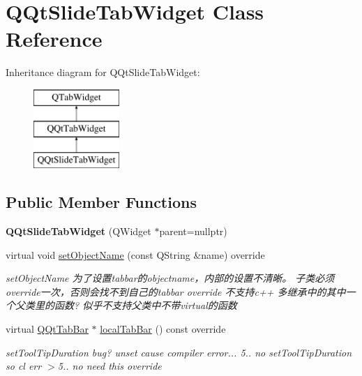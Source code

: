 \hypertarget{class_q_qt_slide_tab_widget}{}\section{Q\+Qt\+Slide\+Tab\+Widget Class Reference}
\label{class_q_qt_slide_tab_widget}
Inheritance diagram for Q\+Qt\+Slide\+Tab\+Widget\+:\begin{figure}[H]
\begin{center}
\leavevmode
\includegraphics[height=3.000000cm]{class_q_qt_slide_tab_widget}
\end{center}
\end{figure}
\subsection*{Public Member Functions}
\begin{DoxyCompactItemize}
\item 
\mbox{\label{class_q_qt_slide_tab_widget_aaab641a580e22349299623aaf33c1b47}} 
{\bfseries Q\+Qt\+Slide\+Tab\+Widget} (Q\+Widget $\ast$parent=nullptr)
\item 
virtual void \mbox{\hyperlink{class_q_qt_slide_tab_widget_a6c263512e6174b8020508cc4f1f86ff9}{set\+Object\+Name}} (const Q\+String \&name) override
\begin{DoxyCompactList}\small\item\em set\+Object\+Name 为了设置tabbar的objectname，内部的设置不清晰。 子类必须override一次，否则会找不到自己的tabbar override 不支持c++ 多继承中的其中一个父类里的函数? 似乎不支持父类中不带virtual的函数 \end{DoxyCompactList}\item 
virtual \mbox{\hyperlink{class_q_qt_tab_bar}{Q\+Qt\+Tab\+Bar}} $\ast$ \mbox{\hyperlink{class_q_qt_slide_tab_widget_a7e4513d3f457ba2e56a8211ac627a25d}{local\+Tab\+Bar}} () const override
\begin{DoxyCompactList}\small\item\em set\+Tool\+Tip\+Duration bug? unset cause compiler error... 5.. no set\+Tool\+Tip\+Duration so cl err $>$5.. no need this override \end{DoxyCompactList}\end{DoxyCompactItemize}


